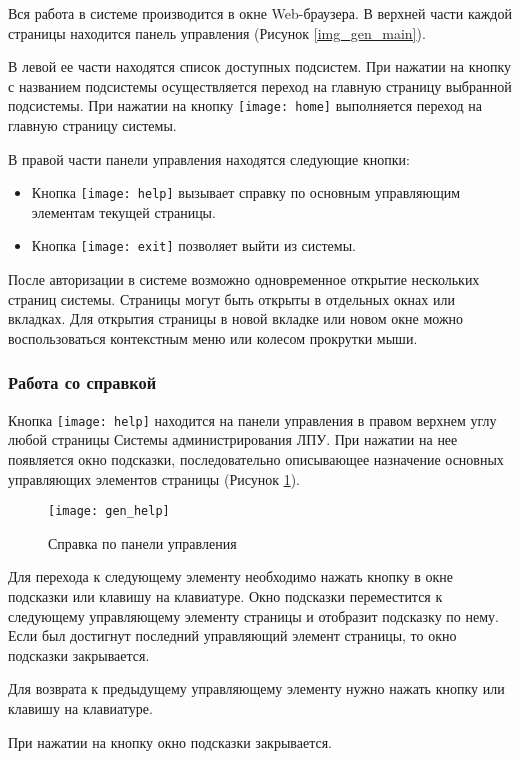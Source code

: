 Вся работа в системе производится в окне Web-браузера. В верхней части каждой страницы находится панель управления (Рисунок \ref{img_gen_main}).

В левой ее части находятся список доступных подсистем. При нажатии на кнопку с названием подсистемы осуществляется переход на главную страницу выбранной подсистемы. При нажатии на кнопку \texttt{[image: home]} выполняется переход на главную страницу системы.

В правой части панели управления находятся следующие кнопки:
\begin{itemize}
 \item Кнопка \texttt{[image: help]}  вызывает справку по основным управляющим элементам текущей страницы.
 \item Кнопка \texttt{[image: exit]}  позволяет выйти из системы.
\end{itemize}

\begin{prim}
 После авторизации в системе возможно одновременное открытие нескольких страниц системы. Страницы могут быть открыты в отдельных окнах или вкладках. Для открытия страницы в новой вкладке или новом окне можно воспользоваться контекстным меню или колесом прокрутки мыши.
\end{prim}

\subsubsection{Работа со справкой}

Кнопка \texttt{[image: help]}  находится на панели управления в правом верхнем углу любой страницы Системы администрирования ЛПУ. При нажатии на нее появляется окно подсказки, последовательно описывающее назначение основных управляющих элементов страницы (Рисунок \ref{img_gen_help}).

\begin{figure}[ht]\centering
 \texttt{[image: gen\_help]}
 \caption{Справка по панели управления}
 \label{img_gen_help}
\end{figure} 

Для перехода к следующему элементу необходимо нажать кнопку   в окне подсказки или клавишу \keys{$\to$} на клавиатуре. Окно подсказки переместится к следующему управляющему элементу страницы и отобразит подсказку по нему. Если был достигнут последний управляющий элемент страницы, то окно подсказки закрывается.

Для возврата к предыдущему управляющему элементу нужно нажать кнопку   или клавишу \keys{$\gets$} на клавиатуре.

При нажатии на кнопку  окно подсказки закрывается.
